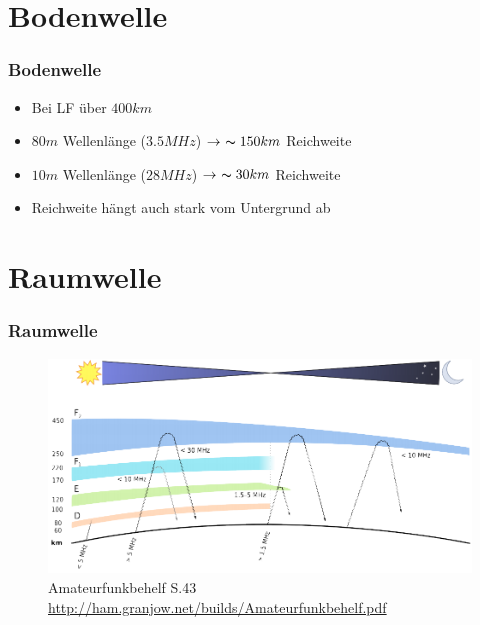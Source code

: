 \section*{Bodenwelle}
\begin{frame}
  \frametitle{Bodenwelle}
  \begin{itemize}
    \item Bei LF über $400km$
    \item $80m$ Wellenlänge ($3.5MHz$) $\rightarrow~\thicksim150km$ Reichweite
    \item $10m$ Wellenlänge ($28MHz$) $\rightarrow~\thicksim30km$ Reichweite
    \item Reichweite hängt auch stark vom Untergrund ab
  \end{itemize}
\end{frame}

\section*{Raumwelle}

\begin{frame}
  \frametitle{Raumwelle}
  \begin{center}
    \begin{figure}
      \includegraphics[width=\textwidth,height=.75\textheight,keepaspectratio]{e09/schichten_behelf_43.png}
      \caption{Amateurfunkbehelf S.43 \ExternalLink \url{http://ham.granjow.net/builds/Amateurfunkbehelf.pdf}}
    \end{figure}
  \end{center}
\end{frame}


